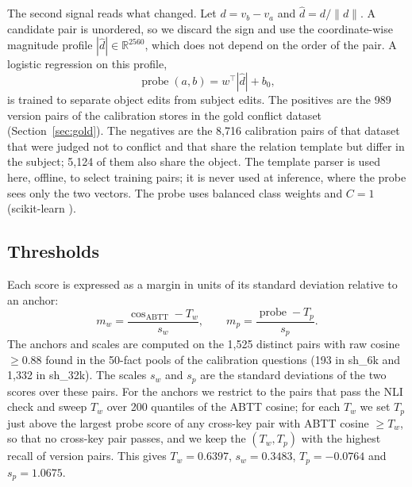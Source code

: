\documentclass[journal=jcisd8,manuscript=article]{achemso}
\newcommand{\sub}[1]{\textsf{sh\_#1}}                    %
\begin{document}
The second signal reads what changed. Let $d=v_b-v_a$ and $\hat d=d/\lVert d\rVert$. A candidate pair is unordered, so we discard the sign and use the coordinate-wise magnitude profile $|\hat d|\in\mathbb{R}^{2560}$, which does not depend on the order of the pair. A logistic regression on this profile,
\begin{equation}
\operatorname{probe}(a,b)=w^{\top}|\hat d|+b_0,
\end{equation}
is trained to separate object edits from subject edits. The positives are the 989 version pairs of the calibration stores in the gold conflict dataset (Section~\ref{sec:gold}). The negatives are the 8,716 calibration pairs of that dataset that were judged not to conflict and that share the relation template but differ in the subject; 5,124 of them also share the object. The template parser is used here, offline, to select training pairs; it is never used at inference, where the probe sees only the two vectors. The probe uses balanced class weights and $C=1$ (scikit-learn \cite{pedregosa2011sklearn}).

\subsection{Thresholds}
\label{sec:margins}

Each score is expressed as a margin in units of its standard deviation relative to an anchor:
\begin{equation}
m_w=\frac{\cos_{\mathrm{ABTT}}-T_w}{s_w},\qquad m_p=\frac{\operatorname{probe}-T_p}{s_p}.
\end{equation}
The anchors and scales are computed on the 1,525 distinct pairs with raw cosine $\ge0.88$ found in the 50-fact pools of the calibration questions (193 in \sub{6k} and 1,332 in \sub{32k}). The scales $s_w$ and $s_p$ are the standard deviations of the two scores over these pairs. For the anchors we restrict to the pairs that pass the NLI check and sweep $T_w$ over 200 quantiles of the ABTT cosine; for each $T_w$ we set $T_p$ just above the largest probe score of any cross-key pair with ABTT cosine $\ge T_w$, so that no cross-key pair passes, and we keep the $(T_w,T_p)$ with the highest recall of version pairs. This gives $T_w=0.6397$, $s_w=0.3483$, $T_p=-0.0764$ and $s_p=1.0675$.
\end{document}
